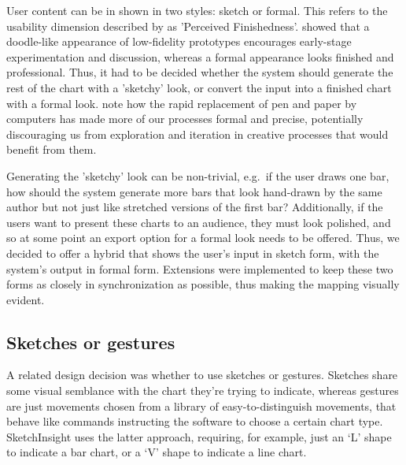 	User content can be in shown in two styles: sketch or formal. This refers to the usability dimension described by \cite{bresciani_collaborative_2008} as 'Perceived Finishedness'. \cite{yeung_effect_2008} showed that a doodle-like appearance of low-fidelity prototypes encourages early-stage experimentation and discussion, whereas a formal appearance looks finished and professional.  Thus, it had to be decided whether the system should generate the rest of the chart with a 'sketchy' look, or convert the input into a finished chart with a formal look. \cite{blackwell_formality_2008} note how the rapid replacement of pen and paper by computers has made more of our processes formal and precise, potentially discouraging us from exploration and iteration in creative processes that would benefit from them.
	
	Generating the 'sketchy' look can be non-trivial, \citep{plimmer_sketchnode:_2010, wang_sketchset:_2011} e.g.\ if the user draws one bar, how should the system generate more bars that look hand-drawn by the same author but not just like stretched versions of the first bar? Additionally, if the users want to present these charts to an audience, they must look polished, and so at some point an export option for a formal look needs to be offered. Thus, we decided to offer a hybrid that shows the user's input in sketch form, with the system's output in formal form. Extensions were implemented to keep these two forms as closely in synchronization as possible, thus making the mapping visually evident.
	
	\subsection{Sketches or gestures}
	A related design decision was whether to use sketches or gestures. Sketches share some visual semblance with the chart they're trying to indicate, whereas gestures are just movements chosen from a library of easy-to-distinguish movements, that behave like commands instructing the software to choose a certain chart type. SketchInsight \citep{walny_understanding_2012} uses the latter approach, requiring, for example, just an `L' shape to indicate a bar chart, or a `V' shape to indicate a line chart. 
	
		
